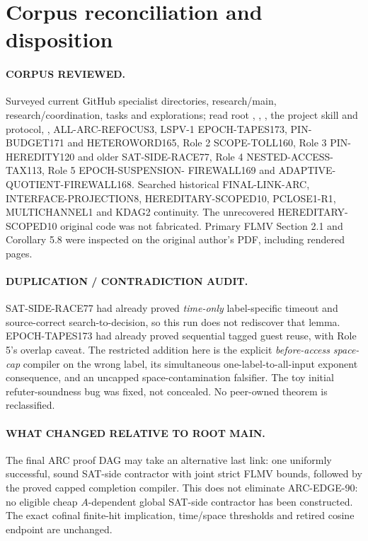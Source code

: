 \documentclass[11pt]{article}
\begin{document}
\section{Corpus reconciliation and disposition}
\paragraph{CORPUS REVIEWED.}
Surveyed current GitHub specialist directories, research/main,
research/coordination, tasks and explorations; read root
, , ,
the project skill and protocol, ,
ALL-ARC-REFOCUS3, LSPV-1 EPOCH-TAPES173,
PIN-BUDGET171 and HETEROWORD165, Role 2 SCOPE-TOLL160,
Role 3 PIN-HEREDITY120 and older SAT-SIDE-RACE77,
Role 4 NESTED-ACCESS-TAX113, Role 5 EPOCH-SUSPENSION-
FIREWALL169 and ADAPTIVE-QUOTIENT-FIREWALL168.
Searched historical FINAL-LINK-ARC,
INTERFACE-PROJECTION8, HEREDITARY-SCOPED10, PCLOSE1-R1,
MULTICHANNEL1 and KDAG2 continuity. The unrecovered
HEREDITARY-SCOPED10 original code was not fabricated.
Primary FLMV Section 2.1 and Corollary 5.8 were inspected
on the original author's PDF, including rendered pages.

\paragraph{DUPLICATION / CONTRADICTION AUDIT.}
SAT-SIDE-RACE77 had already proved \emph{time-only}
label-specific timeout and source-correct search-to-decision,
so this run does not rediscover that lemma. EPOCH-TAPES173
had already proved sequential tagged guest reuse, with
Role 5's overlap caveat. The restricted addition here is
the explicit \emph{before-access space-cap} compiler on
the wrong label, its simultaneous one-label-to-all-input
exponent consequence, and an uncapped space-contamination
falsifier. The toy initial refuter-soundness bug was fixed,
not concealed. No peer-owned theorem is reclassified.

\paragraph{WHAT CHANGED RELATIVE TO ROOT MAIN.}
The final ARC proof DAG may take an alternative last link:
one uniformly successful, sound SAT-side contractor with
joint strict FLMV bounds, followed by the proved capped
completion compiler. This does not eliminate ARC-EDGE-90:
no eligible cheap $A$-dependent global SAT-side contractor
has been constructed. The exact cofinal finite-hit
implication, time/space thresholds and retired cosine
endpoint are unchanged.
\end{document}
